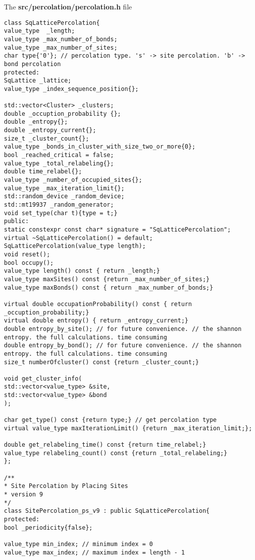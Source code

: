 
The \textbf{src/percolation/percolation.h} file

\begin{lstlisting}[style=CStyle]
class SqLatticePercolation{
value_type  _length;
value_type _max_number_of_bonds;
value_type _max_number_of_sites;
char type{'0'}; // percolation type. 's' -> site percolation. 'b' -> bond percolation
protected:
SqLattice _lattice;
value_type _index_sequence_position{};

std::vector<Cluster> _clusters;   
double _occuption_probability {};
double _entropy{};
double _entropy_current{};
size_t _cluster_count{};
value_type _bonds_in_cluster_with_size_two_or_more{0};
bool _reached_critical = false; 
value_type _total_relabeling{};
double time_relabel{};
value_type _number_of_occupied_sites{};
value_type _max_iteration_limit{};
std::random_device _random_device;
std::mt19937 _random_generator;
void set_type(char t){type = t;} 
public:
static constexpr const char* signature = "SqLatticePercolation";
virtual ~SqLatticePercolation() = default;
SqLatticePercolation(value_type length);
void reset();
bool occupy();
value_type length() const { return _length;}
value_type maxSites() const {return _max_number_of_sites;}
value_type maxBonds() const { return _max_number_of_bonds;}

virtual double occupationProbability() const { return _occuption_probability;}
virtual double entropy() { return _entropy_current;}
double entropy_by_site(); // for future convenience. // the shannon entropy. the full calculations. time consuming
double entropy_by_bond(); // for future convenience. // the shannon entropy. the full calculations. time consuming
size_t numberOfcluster() const {return _cluster_count;}

void get_cluster_info(
std::vector<value_type> &site,
std::vector<value_type> &bond
);

char get_type() const {return type;} // get percolation type
virtual value_type maxIterationLimit() {return _max_iteration_limit;};

double get_relabeling_time() const {return time_relabel;}
value_type relabeling_count() const {return _total_relabeling;}
};

/**
* Site Percolation by Placing Sites
* version 9
*/
class SitePercolation_ps_v9 : public SqLatticePercolation{
protected:
bool _periodicity{false};

value_type min_index; // minimum index = 0
value_type max_index; // maximum index = length - 1


\end{lstlisting}

